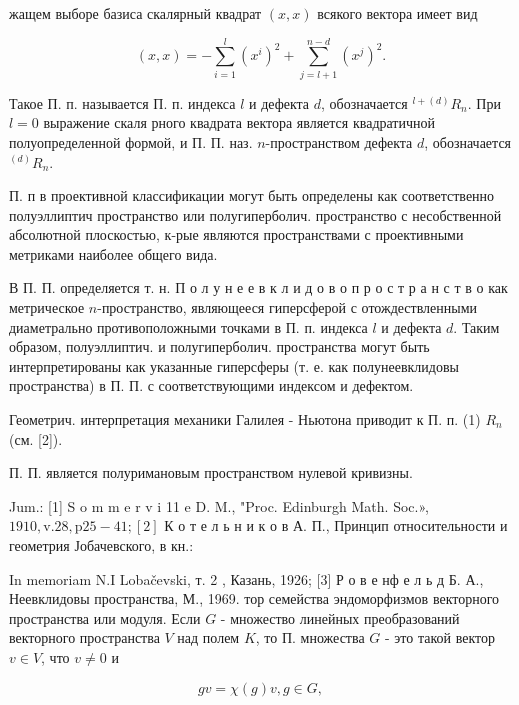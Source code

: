 \documentclass[10pt]{article}
\begin{document}
жащем выборе базиса скалярный квадрат $(x, x)$ всякого вектора имеет вид



\[

(x, x)=-\sum_{i=1}^{l}\left(x^{i}\right)^{2}+\sum_{j=l+1}^{n-d}\left(x^{j}\right)^{2} .

\]



Такое П. п. называется П. п. индекса $l$ и дефекта $d$, обозначается ${ }^{l+(d)} R_{n}$. При $l=0$ выражение скаля рного квадрата вектора является квадратичной полуопределенной формой, и П. П. наз. $n$-пространством дефекта $d$, обозначается ${ }^{(d)} R_{n}$.



П. п в проективной классификации могут быть определены как соответственно полуэллиптич пространство или полугиперболич. пространство с несобственной абсолютной плоскостью, к-рые являются пространствами с проективными метриками наиболее общего вида.



В П. П. определяется т. н. П о л у н е е в к л и д о в о п р о с т р а н с т в о как метрическое $n$-пространство, являющееся гиперсферой с отождествленными диаметрально противоположными точками в П. п. индекса $l$ и дефекта $d$. Таким образом, полуэллиптич. и полугиперболич. пространства могут быть интерпретированы как указанные гиперсферы (т. е. как полунеевклидовы пространства) в П. П. с соответствующими индексом и дефектом.



Геометрич. интерпретация механики Галилея - Ньютона приводит к П. п. (1) $R_{n}$ (см. [2]).



П. П. является полуримановым пространством нулевой кривизны.



Jum.: [1] S o m m e r v i 11 e D. M., "Proc. Edinburgh Math. Soc.», $1910, \mathrm{v} .28, \mathrm{p} 25-41 ;[2]$ К о т е л ь н и к о в А. П., Принцип относительности и геометрия Јобачевского, в кн.:

In memoriam N.I Lobačevski, т. 2 , Казань, 1926; [3] Р о в е нф е л ь д Б. А., Неевклидовы пространства, М., 1969. тор семейства эндоморфизмов векторного пространства или модуля. Если $G$ - множество линейных преобразований векторного пространства $V$ над полем $K$, то П. множества $G$ - это такой вектор $v \in V$, что $v \neq 0$ и



\[

g v=\chi(g) v, g \in G,

\]
\end{document}
